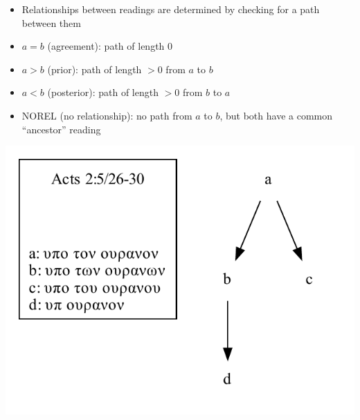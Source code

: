 \documentclass[10pt]{beamer}
\begin{document}
	\begin{frame}
		\begin{itemize}
			\item Relationships between readings are determined by checking for a path between them
			\item $a = b$ (agreement): path of length $0$
			\item $a > b$ (prior): path of length $> 0$ from $a$ to $b$
			\item $a < b$ (posterior): path of length $> 0$ from $b$ to $a$
			\item NOREL (no relationship): no path from $a$ to $b$, but both have a common ``ancestor'' reading
		\end{itemize}
		\begin{center}
			\includegraphics[scale=0.5]{../img/B05K2V5U26-30-local-stemma.pdf}
		\end{center}
	\end{frame}
\end{document}
